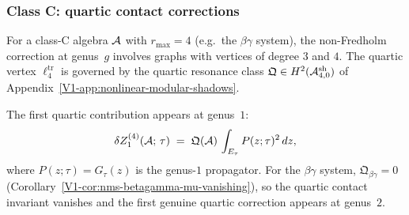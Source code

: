 \begin{example}
\begin{center}
\end{center}
\end{example}

\subsubsection{Class C: quartic contact corrections}

\begin{proposition}%
%
For a class-C algebra $\mathcal{A}$ with $r_{\max} = 4$
\textup{(}e.g.\ the $\beta\gamma$ system\textup{)},
the non-Fredholm correction at genus~$g$ involves
graphs with vertices of degree $3$ and $4$.
The quartic vertex $\ell_4^{\mathrm{tr}}$ is governed by the
quartic resonance class
$\mathfrak{Q} \in H^2(\mathcal{A}^{\mathrm{sh}}_{4,0})$
of Appendix~\textup{\ref*{V1-app:nonlinear-modular-shadows}}.

The first quartic contribution appears at genus~$1$:
\begin{equation}%
\delta Z_1^{(4)}(\cA;\,\tau)
\;=\;
\mathfrak{Q}(\cA)\,
\int_{E_\tau}
P(z;\tau)^2\,dz,
\end{equation}
where $P(z;\tau) = G_\tau(z)$ is the genus-$1$ propagator.
For the $\beta\gamma$ system,
$\mathfrak{Q}_{\beta\gamma} = 0$
\textup{(}Corollary~\textup{\ref*{V1-cor:nms-betagamma-mu-vanishing}}\textup{)},
so the quartic contact invariant vanishes and the first
genuine quartic correction appears at genus~$2$.
\end{proposition}

